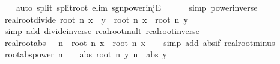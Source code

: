 \begin{isabellebody}
%
\isadelimproof
\ \ %
\endisadelimproof
%
\isatagproof
{}\isamarkupfalse%
\ {\isacharparenleft}{\kern0pt}auto\ split{\isacharcolon}{\kern0pt}\ split{\isacharunderscore}{\kern0pt}root\ elim{\isacharbang}{\kern0pt}{\isacharcolon}{\kern0pt}\ sgn{\isacharunderscore}{\kern0pt}power{\isacharunderscore}{\kern0pt}injE\isanewline
\ \ \ \ \ \ simp{\isacharcolon}{\kern0pt}\ power{\isacharunderscore}{\kern0pt}inverse{\isacharparenright}{\kern0pt}%
\endisatagproof
{\isafoldproof}%
%
\isadelimproof
\isanewline
%
\endisadelimproof
\isanewline
{}\isamarkupfalse%
\ real{\isacharunderscore}{\kern0pt}root{\isacharunderscore}{\kern0pt}divide{\isacharcolon}{\kern0pt}\ {\isachardoublequoteopen}root\ n\ {\isacharparenleft}{\kern0pt}x\ {\isacharslash}{\kern0pt}\ y{\isacharparenright}{\kern0pt}\ {\isacharequal}{\kern0pt}\ root\ n\ x\ {\isacharslash}{\kern0pt}\ root\ n\ y{\isachardoublequoteclose}\isanewline
%
\isadelimproof
\ \ %
\endisadelimproof
%
\isatagproof
{}\isamarkupfalse%
\ {\isacharparenleft}{\kern0pt}simp\ add{\isacharcolon}{\kern0pt}\ divide{\isacharunderscore}{\kern0pt}inverse\ real{\isacharunderscore}{\kern0pt}root{\isacharunderscore}{\kern0pt}mult\ real{\isacharunderscore}{\kern0pt}root{\isacharunderscore}{\kern0pt}inverse{\isacharparenright}{\kern0pt}%
\endisatagproof
{\isafoldproof}%
%
\isadelimproof
\isanewline
%
\endisadelimproof
\isanewline
{}\isamarkupfalse%
\ real{\isacharunderscore}{\kern0pt}root{\isacharunderscore}{\kern0pt}abs{\isacharcolon}{\kern0pt}\ {\isachardoublequoteopen}{}\ {\isacharless}{\kern0pt}\ n\ {\isasymLongrightarrow}\ root\ n\ {\isasymbar}x{\isasymbar}\ {\isacharequal}{\kern0pt}\ {\isasymbar}root\ n\ x{\isasymbar}{\isachardoublequoteclose}\isanewline
%
\isadelimproof
\ \ %
\endisadelimproof
%
\isatagproof
{}\isamarkupfalse%
\ {\isacharparenleft}{\kern0pt}simp\ add{\isacharcolon}{\kern0pt}\ abs{\isacharunderscore}{\kern0pt}if\ real{\isacharunderscore}{\kern0pt}root{\isacharunderscore}{\kern0pt}minus{\isacharparenright}{\kern0pt}%
\endisatagproof
{\isafoldproof}%
%
\isadelimproof
\isanewline
%
\endisadelimproof
\isanewline
{}\isamarkupfalse%
\ root{\isacharunderscore}{\kern0pt}abs{\isacharunderscore}{\kern0pt}power{\isacharcolon}{\kern0pt}\ {\isachardoublequoteopen}n\ {\isachargreater}{\kern0pt}\ {}\ {\isasymLongrightarrow}\ abs\ {\isacharparenleft}{\kern0pt}root\ n\ {\isacharparenleft}{\kern0pt}y\ {\isacharcircum}{\kern0pt}n{\isacharparenright}{\kern0pt}{\isacharparenright}{\kern0pt}\ {\isacharequal}{\kern0pt}\ abs\ y{\isachardoublequoteclose}\isanewline

\end{isabellebody}
